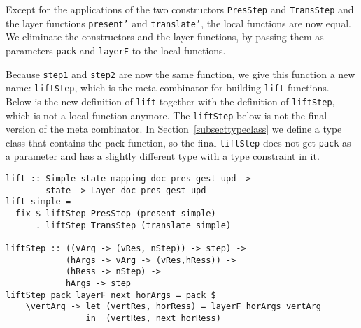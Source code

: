 \par Except for the applications of the two constructors \texttt{PresStep}
        and \texttt{TransStep} and the layer functions \texttt{present'} and
        \texttt{translate'}, the local functions are now equal. We eliminate the
        constructors and the layer functions, by passing them as parameters
        \texttt{pack} and \texttt{layerF} to the local functions.
\par Because \texttt{step1} and \texttt{step2} are now the same function,
        we give this function a new name: \texttt{liftStep}, which is the meta
        combinator for building \texttt{lift} functions. Below is the new definition of
        \texttt{lift} together with the definition of \texttt{liftStep}, which is not a
        local function anymore. The \texttt{liftStep} below is not the final version of
        the meta combinator. In Section~\ref{subsecttypeclass} we define
        a type class that contains the pack function, so the final \texttt{liftStep}
        does not get \texttt{pack} as a parameter and has a slightly different type
        with a type constraint in it.\begin{small}\begin{verbatim}lift :: Simple state mapping doc pres gest upd ->
        state -> Layer doc pres gest upd
lift simple = 
  fix $ liftStep PresStep (present simple) 
      . liftStep TransStep (translate simple) 

liftStep :: ((vArg -> (vRes, nStep)) -> step) ->
            (hArgs -> vArg -> (vRes,hRess)) ->
            (hRess -> nStep) ->
            hArgs -> step
liftStep pack layerF next horArgs = pack $
    \vertArg -> let (vertRes, horRess) = layerF horArgs vertArg
                in  (vertRes, next horRess)\end{verbatim}\end{small}

